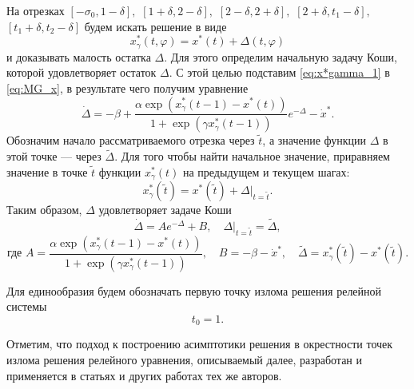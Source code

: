 На отрезках 
$[-\sigma_0, 1 - \delta],$ 
$[1 + \delta, 2 - \delta],$ 
$[2 - \delta, 2 + \delta],$ 
$[2 + \delta, t_1 - \delta],$ 
$[t_1 + \delta, t_2 - \delta]$ 
будем искать решение в виде
%
\begin{equation}
    \label{eq:x*gamma_1}
    x^*_\gamma(t, \varphi) = x^*(t) + \Delta(t, \varphi)
\end{equation}
%
и доказывать малость остатка $\Delta$. Для этого определим начальную задачу Коши, которой удовлетворяет остаток $\Delta$. С этой целью подставим \eqref{eq:x*gamma_1} в \eqref{eq:MG_x}, в результате чего получим уравнение
%
\begin{equation*}
    \dot{\Delta} = -\beta + \frac{\alpha\exp(x_{\gamma}^*(t - 1) - x^*(t))}{1 + \exp(\gamma x_{\gamma}^*(t - 1))}e^{-\Delta}-\dot{x}^*.
\end{equation*}
%
Обозначим начало рассматриваемого отрезка через $\tilde{t}$, а значение функции $\Delta$ в этой точке --- через $\tilde{\Delta}$. Для того чтобы найти начальное значение, приравняем значение в точке $\tilde{t}$ функции $x_{\gamma}^*(t)$ на предыдущем и текущем шагах:
%
\[x_{\gamma}^*(\tilde{t}) = x^*(\tilde{t}) + \Delta|_{t=\tilde{t}}.\]
%
Таким образом, $\Delta$ удовлетворяет задаче Коши
\begin{equation}
        \label{eq:task_DeltaAB}
        \dot{\Delta}=A e^{-\Delta} + B,\quad \Delta|_{t=\tilde{t}}=\tilde{\Delta},
\end{equation}
%
\begin{equation}
    \label{AB_eq:x*gamma_1}
\text{где } A = \frac{\alpha\exp(x_{\gamma}^*(t - 1) - x^*(t))}{1+\exp(\gamma x_{\gamma}^*(t - 1))},\quad
B = -\beta-\dot{x}^*,\quad 
\tilde{\Delta}=x_{\gamma}^*(\tilde{t}) - x^*(\tilde{t}).
\end{equation}

Для единообразия будем обозначать первую точку излома решения релейной системы
\begin{equation}
	\label{eq:t0:ch1}
	t_0 = 1.
\end{equation}

Отметим, что подход к построению асимптотики решения в окрестности точек излома решения релейного уравнения, описываемый далее, разработан и применяется в статьях \cite{Kolesov1997, Kolesov2010, Glyzin2013} и других работах тех же авторов.

